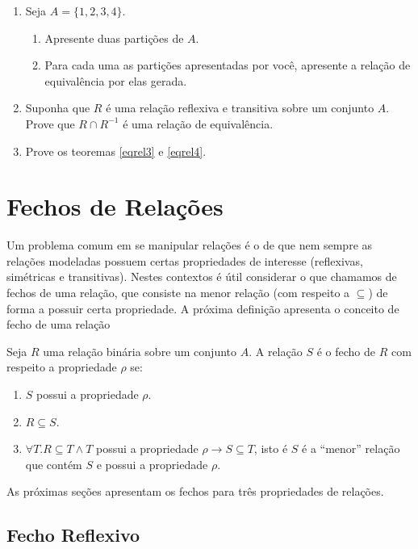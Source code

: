 \begin{enumerate}
  \item Seja $A = \{1,2,3,4\}$.
  \begin{enumerate}
    \item Apresente duas partições de $A$.
    \item Para cada uma as partições apresentadas por você, apresente
      a relação de equivalência por elas  gerada.
   \end{enumerate}
  \item Suponha que $R$ é uma relação reflexiva e transitiva sobre um
    conjunto $A$. Prove que $R \cap R^{-1}$ é uma relação de equivalência.
  \item Prove os teoremas \ref{eqrel3} e \ref{eqrel4}.
\end{enumerate}


\section{Fechos de Relações}

Um problema comum em se manipular relações é o de que nem sempre as
relações modeladas possuem certas propriedades de interesse
(reflexivas, simétricas e transitivas). Nestes contextos é útil
considerar o que chamamos de fechos de uma relação, que consiste na
menor relação (com respeito a $\subseteq$) de forma a possuir certa
propriedade. A próxima definição apresenta o conceito de fecho de uma
relação

\begin{Definition}
Seja $R$ uma relação binária sobre um conjunto $A$. A relação $S$ é o
fecho de $R$ com respeito a propriedade $\rho$ se:
\begin{enumerate}
  \item $S$ possui a propriedade $\rho$.
  \item $R \subseteq S$.
  \item $\forall T. R \subseteq T \land  T$ possui a propriedade $\rho
    \to S \subseteq T$, isto é $S$ é a ``menor'' relação que contém
    $S$ e possui a propriedade $\rho$.
\end{enumerate}
\end{Definition}
As próximas seções apresentam os fechos para três propriedades de relações.

\subsection{Fecho Reflexivo}

